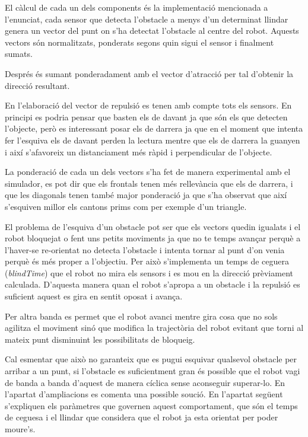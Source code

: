 El càlcul de cada un dels components és la implementació mencionada a l'enunciat, cada sensor que
detecta l'obstacle a menys d'un determinat llindar genera un vector del punt on s'ha detectat l'obstacle
al centre del robot. Aquests vectors són normalitzats, ponderats segons quin sigui el sensor i finalment
sumats.

Després és sumant ponderadament amb el vector d'atracció per tal d'obtenir la direcció resultant.

En l'elaboració del vector de repulsió es tenen amb compte tots els sensors. En principi es podria pensar
que basten els de davant ja que són els que detecten l'objecte, però es interessant posar els de darrera
ja que en el moment que intenta fer l'esquiva els de davant perden la lectura mentre que els de darrera
la guanyen i així s'afavoreix un distanciament més ràpid i perpendicular de l'objecte. 

La ponderació de cada un dels vectors s'ha fet de manera experimental amb el simulador, es pot dir
que els frontals tenen més rellevància que els de darrera, i que les diagonals tenen també major
ponderació ja que s'ha observat que així s'esquiven millor els cantons prims com per exemple d'un triangle.

El problema de l'esquiva d'un obstacle pot ser que els vectors quedin igualats i el robot bloquejat
o fent uns petits moviments ja que no te temps avançar perquè a l'haver-se re-orientat no detecta l'obstacle
i intenta  tornar al punt d'on venia perquè és més proper a l'objectiu. Per això s'implementa un temps de
ceguera (\emph{blindTime}) que el robot no mira els sensors i es mou en la direcció prèviament calculada.
D'aquesta manera quan el robot s'apropa a un obstacle i la repulsió es suficient aquest es gira en sentit
oposat i avança.

Per altra banda es permet que el robot avanci mentre gira cosa que no sols agilitza el moviment sinó que
modifica la trajectòria del robot evitant que torni al mateix punt disminuint les possibilitats de bloqueig.

Cal esmentar que això no garanteix que es pugui esquivar qualsevol obstacle per arribar a un punt, 
si l'obstacle es suficientment gran és possible que el robot vagi de banda a banda d'aquest de manera
cíclica sense aconseguir superar-lo. En l'apartat d'ampliacions es comenta una possible so\lgem ució. En
l'apartat següent s'expliquen els paràmetres que governen aquest comportament, que són el temps
de ceguesa i el llindar que considera que el robot ja esta orientat per poder moure's.

